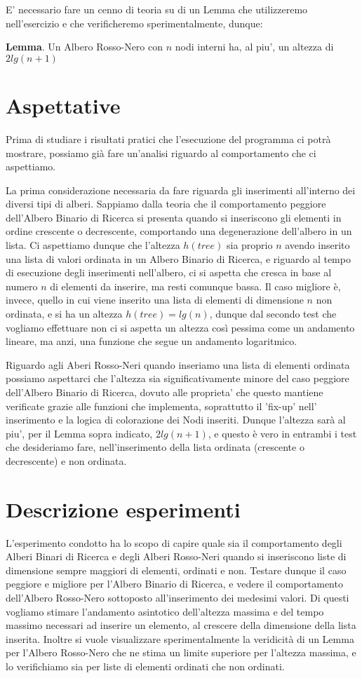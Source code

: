 \documentclass{article}
\begin{document}
E' necessario fare un cenno di teoria su di un Lemma che utilizzeremo nell'esercizio e che verificheremo sperimentalmente, dunque:


\textbf{Lemma}. Un Albero Rosso-Nero con $n$ nodi interni ha, al piu', un altezza di $2 lg(n+1)$ 

\section{Aspettative}
Prima di studiare i risultati pratici che l'esecuzione del programma ci potrà mostrare, possiamo già fare un'analisi riguardo al comportamento che ci aspettiamo.

La prima considerazione necessaria da fare riguarda gli inserimenti all'interno dei diversi tipi di alberi.
Sappiamo dalla teoria che il comportamento peggiore dell'Albero Binario di Ricerca si presenta quando si inseriscono gli elementi in ordine crescente o decrescente, comportando una degenerazione dell'albero in un lista. Ci aspettiamo dunque che l'altezza $h(tree)$ sia proprio $n$ avendo inserito una lista di valori ordinata in un Albero Binario di Ricerca, e riguardo al tempo di esecuzione degli inserimenti nell'albero, ci si aspetta che cresca in base al numero $n$ di elementi da inserire, ma resti comunque bassa.
Il caso migliore è, invece, quello in cui viene inserito una lista di elementi di dimensione $n$ non ordinata, e si ha un altezza $h(tree) = lg(n)$, dunque dal secondo test che vogliamo effettuare non ci si aspetta un altezza così pessima come un andamento lineare, ma anzi, una funzione che segue un andamento logaritmico.

Riguardo agli Aberi Rosso-Neri quando inseriamo una lista di elementi ordinata possiamo aspettarci che l'altezza sia significativamente minore del caso peggiore dell'Albero Binario di Ricerca, dovuto alle proprieta' che questo mantiene verificate grazie alle funzioni che implementa, soprattutto il 'fix-up' nell' inserimento e la logica di colorazione dei Nodi inseriti.
Dunque l'altezza sarà al piu', per il Lemma sopra indicato, $2 lg(n+1)$, e questo è vero in entrambi i test che desideriamo fare, nell'inserimento della lista ordinata (crescente o decrescente) e non ordinata.
\newpage

\section{Descrizione esperimenti}
L'esperimento condotto ha lo scopo di capire quale sia il comportamento degli Alberi Binari di Ricerca e degli Alberi Rosso-Neri quando si inseriscono liste di dimensione sempre maggiori di elementi, ordinati e non.
Testare dunque il caso peggiore e migliore per l'Albero Binario di Ricerca, e vedere il comportamento dell'Albero Rosso-Nero sottoposto all'inserimento dei medesimi valori.
Di questi vogliamo stimare l'andamento asintotico dell'altezza massima e del tempo massimo necessari ad inserire un elemento, al crescere della dimensione della lista inserita. 
Inoltre si vuole visualizzare sperimentalmente la veridicità di un Lemma per l'Albero Rosso-Nero che ne stima un limite superiore per l'altezza massima, e lo verifichiamo sia per liste di elementi ordinati che non ordinati.
\end{document}
